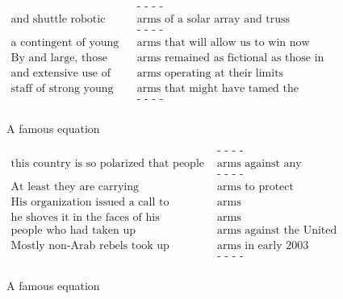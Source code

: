 \documentclass[a4paper,12pt,twoside,openright]{report}
\begin{document}
\begin{figure}[H]
\begin{align}
\text{                              } & \text{- - - -} \nonumber \\
\text{and shuttle robotic } & \text{arms of a solar array and truss}  \nonumber\\
\text{                              } & \text{- - - -} \nonumber \\
\text{a contingent of young } & \text{arms that will allow us to win now}  \nonumber\\
\text{By and large, those } & \text{arms remained as fictional as those in "The War \ldots"}  \nonumber\\
\text{and extensive use of robotic } & \text{arms operating at their limits}  \nonumber\\
\text{staff of strong young } & \text{arms that might have tamed the National League East} \nonumber \\
\text{                              } & \text{- - - -} \nonumber \\
\end{align}
\caption{A famous equation}
\end{figure}



\begin{figure}[H]
\begin{align}
\text{                                                   } & \text{- - - -} \nonumber \\
\text{this country is so polarized that people spring to } & \text{arms against any proposal} \nonumber \\
\text{                                                   } & \text{- - - -} \nonumber \\
                        \text{At least they are carrying } & \text{arms to protect themselves} \nonumber \\
                 \text{His organization issued a call to } & \text{arms} \nonumber \\
      \text{he shoves it in the faces of his comrades in } & \text{arms} \nonumber \\
                           \text{people who had taken up } & \text{arms against the United States} \nonumber \\
                    \text{Mostly non-Arab rebels took up } & \text{arms in early 2003} \nonumber \\
\text{                                                   } & \text{- - - -} \nonumber \\
\end{align}
\caption{A famous equation}
\end{figure}
\end{document}
